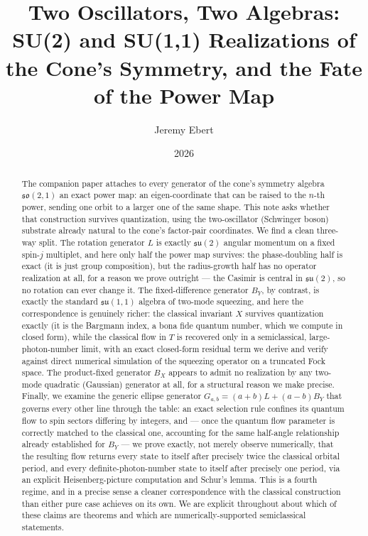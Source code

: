 \documentclass[11pt]{amsart}
\title[Two Algebras: SU(2) and SU(1,1) on the Cone]{Two Oscillators, Two Algebras: SU(2) and SU(1,1) Realizations of the Cone's Symmetry, and the Fate of the Power Map}
\author{Jeremy Ebert}
\date{2026}
\theoremstyle{remark}
\begin{document}
\maketitle

\begin{abstract}
The companion paper \cite{Ebert2026EigenCoord} attaches to every generator of the cone's symmetry algebra $\mathfrak{so}(2,1)$ an exact power map: an eigen-coordinate that can be raised to the $n$-th power, sending one orbit to a larger one of the same shape. This note asks whether that construction survives quantization, using the two-oscillator (Schwinger boson) substrate already natural to the cone's factor-pair coordinates. We find a clean three-way split. The rotation generator $L$ is exactly $\mathfrak{su}(2)$ angular momentum on a fixed spin-$j$ multiplet, and here only half the power map survives: the phase-doubling half is exact (it is just group composition), but the radius-growth half has no operator realization at all, for a reason we prove outright --- the Casimir is central in $\mathfrak{su}(2)$, so no rotation can ever change it. The fixed-difference generator $B_Y$, by contrast, is exactly the standard $\mathfrak{su}(1,1)$ algebra of two-mode squeezing, and here the correspondence is genuinely richer: the classical invariant $X$ survives quantization exactly (it is the Bargmann index, a bona fide quantum number, which we compute in closed form), while the classical flow in $T$ is recovered only in a semiclassical, large-photon-number limit, with an exact closed-form residual term we derive and verify against direct numerical simulation of the squeezing operator on a truncated Fock space. The product-fixed generator $B_X$ appears to admit no realization by any two-mode quadratic (Gaussian) generator at all, for a structural reason we make precise. Finally, we examine the generic ellipse generator $G_{a,b}=(a+b)L+(a-b)B_Y$ that governs every other line through the table: an exact selection rule confines its quantum flow to spin sectors differing by integers, and — once the quantum flow parameter is correctly matched to the classical one, accounting for the same half-angle relationship already established for $B_Y$ — we prove exactly, not merely observe numerically, that the resulting flow returns every state to itself after precisely twice the classical orbital period, and every definite-photon-number state to itself after precisely one period, via an explicit Heisenberg-picture computation and Schur's lemma. This is a fourth regime, and in a precise sense a cleaner correspondence with the classical construction than either pure case achieves on its own. We are explicit throughout about which of these claims are theorems and which are numerically-supported semiclassical statements.
\end{abstract}
\end{document}
